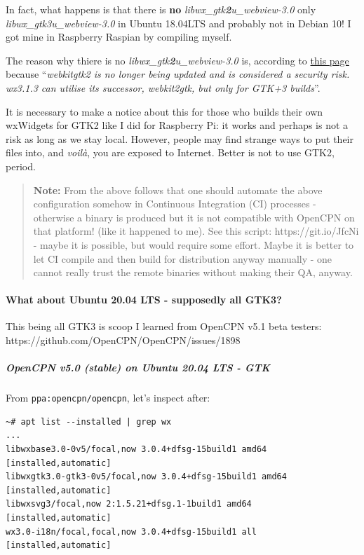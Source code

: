 \documentclass[11pt]{article}
\begin{document}
    In fact, what happens is that there is \textbf{no}
\emph{libwx\_gtk\textbf{2}u\_webview-3.0} only
\emph{libwx\_gtk3u\_webview-3.0} in Ubuntu 18.04LTS and probably not in
Debian 10! I got mine in Raspberry Raspian by compiling myself.

    The reason why thiere is no \emph{libwx\_gtk\textbf{2}u\_webview-3.0}
is, according to
\href{https://wiki.codelite.org/pmwiki.php/Main/WxWidgets31Binaries\#toc2}{this
page} because ``\emph{webkitgtk2 is no longer being updated and is
considered a security risk. wx3.1.3 can utilise its successor,
webkit2gtk, but only for GTK+3 builds}''.

    It is necessary to make a notice about this for those who builds their
own wxWidgets for GTK2 like I did for Raspberry Pi: it works and perhaps
is not a risk as long as we stay local. However, people may find strange
ways to put their files into, and \emph{voilà}, you are exposed to
Internet. Better is not to use GTK2, period.

    \begin{quote}
\textbf{Note:} From the above follows that one should automate the above
configuration somehow in Continuous Integration (CI) processes -
otherwise a binary is produced but it is not compatible with OpenCPN on
that platform! (like it happened to me). See this script:
https://git.io/JfcNi - maybe it is possible, but would require some
effort. Maybe it is better to let CI compile and then build for
distribution anyway manually - one cannot really trust the remote
binaries without making their QA, anyway.
\end{quote}

    \hypertarget{what-about-ubuntu-20.04-lts---supposedly-all-gtk3}{%
\paragraph{What about Ubuntu 20.04 LTS - supposedly all
GTK3?}\label{what-about-ubuntu-20.04-lts---supposedly-all-gtk3}}

    This being all GTK3 is scoop I learned from OpenCPN v5.1 beta testers:
https://github.com/OpenCPN/OpenCPN/issues/1898

    \hypertarget{opencpn-v5.0-stable-on-ubuntu-20.04-lts---gtk}{%
\subparagraph{OpenCPN v5.0 (stable) on Ubuntu 20.04 LTS -
GTK}\label{opencpn-v5.0-stable-on-ubuntu-20.04-lts---gtk}}

    From \texttt{ppa:opencpn/opencpn}, let's inspect after:

    \begin{verbatim}
~# apt list --installed | grep wx
...
libwxbase3.0-0v5/focal,now 3.0.4+dfsg-15build1 amd64 [installed,automatic]
libwxgtk3.0-gtk3-0v5/focal,now 3.0.4+dfsg-15build1 amd64 [installed,automatic]
libwxsvg3/focal,now 2:1.5.21+dfsg.1-1build1 amd64 [installed,automatic]
wx3.0-i18n/focal,focal,now 3.0.4+dfsg-15build1 all [installed,automatic]
\end{verbatim}
\end{document}
